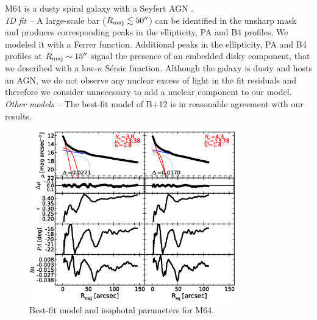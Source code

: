 \documentclass[preprint2]{emulateapj}
\newcommand{\fitfigurewidth}{0.8\textwidth}
\begin{document}
  M64 is a dusty spiral galaxy with a Seyfert AGN \citep{veroncettyveron2006}. \\

  \emph{1D fit -- }
  A large-scale bar ($R_{\rm maj} \lesssim 50''$) can be identified in the unsharp mask 
  and produces corresponding peaks in the ellipticity, PA and B4 profiles.
  We modeled it with a Ferrer function.
  Additional peaks in the ellipticity, PA and B4 profiles at $R_{\rm maj} \sim 15''$ 
  signal the presence of an embedded disky component, that we described with a low-$n$
  S\'ersic function.
  Although the galaxy is dusty and hosts an AGN, we do not observe any nuclear excess of light 
  in the fit residuals and therefore we consider unnecessary to add a nuclear component to our model. \\
  
  \emph{Other models -- } 
  The best-fit model of B+12 is in reasonable agreement with our results. 
  
  \begin{figure}[h]
  \begin{center}
  \includegraphics[width=\fitfigurewidth]{images/m64_1Dfit.eps}
  \caption{Best-fit model and isophotal parameters for M64.}
  \end{center}
  \end{figure}
\end{document}
